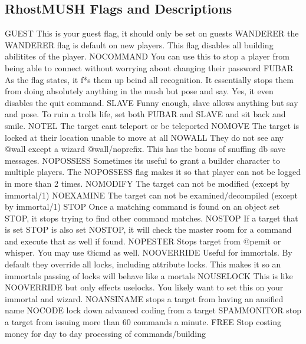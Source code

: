 \documentclass[letterpaper,10pt,english]{sphinxmanual}
\begin{document}
\subsection{RhostMUSH Flags and Descriptions}
\label{\detokenize{security:rhostmush-flags-and-descriptions}}
\begin{sphinxVerbatim}[commandchars=\\\{\}]
GUEST       \PYGZhy{} This is your guest flag, it should only be set on guests
WANDERER    \PYGZhy{} the WANDERER flag is default on new players.  This flag disables all building abilitites of the player.
NO\PYGZus{}COMMAND  \PYGZhy{} You can use this to stop a player from being able to connect without worrying about changing their password
FUBAR       \PYGZhy{} As the flag states, it f*\PYGZsq{}s them up beind all recognition.  It essentially stops them from doing absolutely anything in the mush but pose and say.  Yes, it even disables the quit command.
SLAVE       \PYGZhy{} Funny enough, slave allows anything but say and pose.  To ruin a troll\PYGZsq{}s life, set both FUBAR and SLAVE and sit back and smile.
NO\PYGZus{}TEL      \PYGZhy{} The target can\PYGZsq{}t teleport or be teleported
NO\PYGZus{}MOVE     \PYGZhy{} The target is locked at their location unable to move at all
NO\PYGZus{}WALL     \PYGZhy{} They do not see any @wall except a wizard @wall/no\PYGZus{}prefix.  This has the bonus of snuffing db save messages.
NO\PYGZus{}POSSESS  \PYGZhy{} Sometimes it\PYGZsq{}s useful to grant a builder character to multiple players.  The NO\PYGZus{}POSSESS flag makes it so that player can not be logged in more than 2 times.
NO\PYGZus{}MODIFY   \PYGZhy{} The target can not be modified (except by immortal/\PYGZsh{}1)
NO\PYGZus{}EXAMINE  \PYGZhy{} The target can not be examined/decompiled (except by immortal/\PYGZsh{}1)
STOP        \PYGZhy{} Once a matching \PYGZdl{}command is found on an object set STOP, it \PYGZsq{}stops\PYGZsq{} trying to find other \PYGZdl{}command matches.
NOSTOP      \PYGZhy{} If a target that is set STOP is also set NOSTOP, it will check the master room for a command and execute that as well if found.
NO\PYGZus{}PESTER   \PYGZhy{} Stops target from @pemit or whisper.  You may use @icmd as well.
NO\PYGZus{}OVERRIDE \PYGZhy{} Useful for immortals.  By default they override all locks, including attribute locks.  This makes it so an immortal\PYGZsq{}s passing of locks will behave like a mortals
NO\PYGZus{}USELOCK  \PYGZhy{} This is like NO\PYGZus{}OVERRIDE but only effects uselocks.  You likely want to set this on your immortal and wizard.
NO\PYGZus{}ANSINAME \PYGZhy{} stops a target from having an ansified name
NO\PYGZus{}CODE     \PYGZhy{} lock down advanced coding from a target
SPAMMONITOR \PYGZhy{} stop a target from issuing more than 60 commands a minute.
FREE        \PYGZhy{} Stop costing money for day to day processing of commands/building
\end{sphinxVerbatim}
\end{document}
